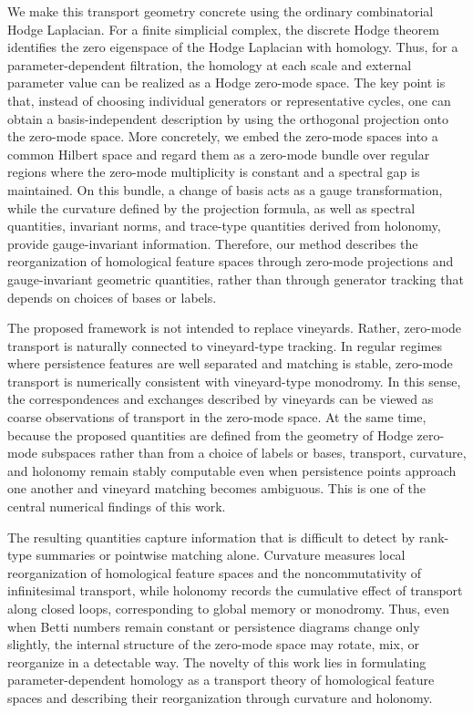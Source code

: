 \documentclass[pdflatex,sn-mathphys-num]{sn-jnl}%
\theoremstyle{thmstyleone}%
\theoremstyle{thmstyletwo}%
\theoremstyle{thmstylethree}%
\begin{document}
We make this transport geometry concrete using the ordinary combinatorial Hodge Laplacian. For a finite simplicial complex, the discrete Hodge theorem identifies the zero eigenspace of the Hodge Laplacian with homology. Thus, for a parameter-dependent filtration, the homology at each scale and external parameter value can be realized as a Hodge zero-mode space. The key point is that, instead of choosing individual generators or representative cycles, one can obtain a basis-independent description by using the orthogonal projection onto the zero-mode space.
More concretely, we embed the zero-mode spaces into a common Hilbert space and regard them as a zero-mode bundle over regular regions where the zero-mode multiplicity is constant and a spectral gap is maintained. On this bundle, a change of basis acts as a gauge transformation, while the curvature defined by the projection formula, as well as spectral quantities, invariant norms, and trace-type quantities derived from holonomy, provide gauge-invariant information. Therefore, our method describes the reorganization of homological feature spaces through zero-mode projections and gauge-invariant geometric quantities, rather than through generator tracking that depends on choices of bases or labels.

The proposed framework is not intended to replace vineyards. Rather, zero-mode transport is naturally connected to vineyard-type tracking. In regular regimes where persistence features are well separated and matching is stable, zero-mode transport is numerically consistent with vineyard-type monodromy. In this sense, the correspondences and exchanges described by vineyards can be viewed as coarse observations of transport in the zero-mode space. At the same time, because the proposed quantities are defined from the geometry of Hodge zero-mode subspaces rather than from a choice of labels or bases, transport, curvature, and holonomy remain stably computable even when persistence points approach one another and vineyard matching becomes ambiguous. This is one of the central numerical findings of this work.

The resulting quantities capture information that is difficult to detect by rank-type summaries or pointwise matching alone. Curvature measures local reorganization of homological feature spaces and the noncommutativity of infinitesimal transport, while holonomy records the cumulative effect of transport along closed loops, corresponding to global memory or monodromy. Thus, even when Betti numbers remain constant or persistence diagrams change only slightly, the internal structure of the zero-mode space may rotate, mix, or reorganize in a detectable way. The novelty of this work lies in formulating parameter-dependent homology as a transport theory of homological feature spaces and describing their reorganization through curvature and holonomy.
\end{document}
